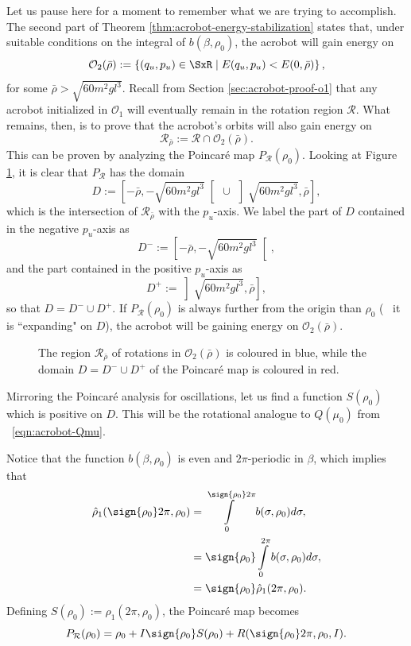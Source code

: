 Let us pause here for a moment to remember what we are trying to accomplish.
The second part of Theorem \ref{thm:acrobot-energy-stabilization} states that,
under suitable conditions on the integral of \(b(\beta,\rho_0)\), 
the acrobot will gain energy on 
\[
    \mathcal{O}_2(\bar{\rho}) := \left\{ (q_u,p_u) \in \SxR
    \mid E(q_u,p_u) < E(0,\bar{\rho}) \right\}
    ,
\]
for some \(\bar{\rho} > \sqrt{60m^2gl^3}\).
Recall from Section \ref{sec:acrobot-proof-o1} that any acrobot initialized in
\(\mathcal{O}_1\) will eventually remain in the rotation region \(\mathcal{R}\).
What remains, then, is to prove that the acrobot's orbits will also gain
energy on
\[
    \mathcal{R}_{\bar{\rho}} := \mathcal{R} \cap \mathcal{O}_2(\bar{\rho})
    .
\]
This can be proven by analyzing the Poincar\'{e} map \(P_\mathcal{R}(\rho_0)\).
Looking at Figure \ref{fig:acrobot-rhobar-regions}, it is clear that
\(P_\mathcal{R}\) has the domain
\[
    D := \left[-\bar{\rho},-\sqrt{60m^2gl^3}\right[ \, 
    \cup \, 
    \left]\sqrt{60m^2gl^3},\bar{\rho}\right]
    ,
\]
which is the intersection of \(\mathcal{R}_{\bar{\rho}}\) with the \(p_u\)-axis.
We label the part of \(D\) contained in the negative \(p_u\)-axis as
\[
    D^- :=\left[-\bar{\rho},-\sqrt{60m^2gl^3}\right[
    ,
\]
and the part contained in the positive \(p_u\)-axis as
\[
    D^+ := \left]\sqrt{60m^2gl^3},\bar{\rho}\right]
    ,
\]
so that \(D = D^- \cup D^+\).
If \(P_\mathcal{R}(\rho_0)\) is always further from the origin than 
\(\rho_0\) (\ie~ it is ``expanding" on \(D\)), the acrobot will be gaining energy
on \(\mathcal{O}_2(\bar{\rho})\).

\begin{figure}
    \centering
    
    \caption{The region \(\mathcal{R}_{\bar{\rho}}\) of rotations in
        \(\mathcal{O}_2(\bar{\rho})\) is coloured
        in blue, while the domain \(D = D^- \cup D^+\) of the Poincar\'{e} map 
        is coloured in red.}
    \label{fig:acrobot-rhobar-regions}
\end{figure}

Mirroring the Poincar\'{e} analysis for oscillations, let us find a
function \(S(\rho_0)\) which is positive on \(D\).
This will be the rotational analogue to \(Q(\mu_0)\) from
~\eqref{eqn:acrobot-Qmu}.

Notice that the function \(b(\beta,\rho_0)\) is even and
\(2\pi\)-periodic in \(\beta\), which implies that
\begin{align*}
    \hat{\rho}_1(\sign{\rho_0}2\pi, \rho_0) &=
    \int \limits_0^{\sign{\rho_0}2\pi} b(\sigma,\rho_0)d\sigma
    , \\
     &=\sign{\rho_0}\int\limits_0^{2\pi}b(\sigma,\rho_0)d\sigma
     , \\
     &= \sign{\rho_0} \hat{\rho}_1(2\pi,\rho_0)
     .
\end{align*}
Defining \(S(\rho_0) := \hat{\rho}_1(2\pi,\rho_0)\),
the Poincar\'{e} map becomes
\begin{equation}\label{eqn:acrobot-poincare-r}
    P_\mathcal{R}(\rho_0) = \rho_0 + I\sign{\rho_0}S(\rho_0) 
    + R(\sign{\rho_0}2\pi,\rho_0,I)
    .
\end{equation}


